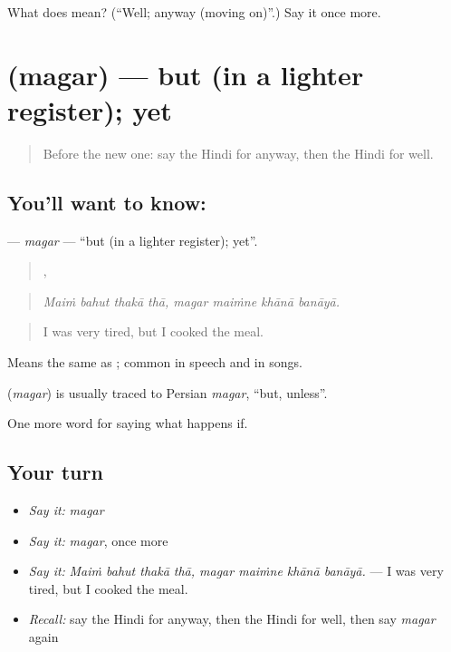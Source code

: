 \begin{tcolorbox}[breakable,colback=teal!4,colframe=teal!35!black,title={Before you move on}]
What does  mean? (\textquotedblleft{}Well; anyway (moving on)\textquotedblright{}.) Say it once more.
\end{tcolorbox}
\section[\texorpdfstring{\hi{मगर} (magar)}{मगर (magar)}]{ (magar) — but (in a lighter register); yet}

\label{lesson:HI-C552-magar}



\begin{quote}
Before the new one: say the Hindi for anyway, then the Hindi for well.
\end{quote}

\subsection*{You'll want to know: }
\textbf{} — \emph{magar} — \textquotedblleft{}but (in a lighter register); yet\textquotedblright{}.

\begin{quote}
   ,    
\end{quote}

\begin{quote}
\emph{Maiṁ bahut thakā thā, magar maiṁne khānā banāyā.}
\end{quote}

\begin{quote}
I was very tired, but I cooked the meal.
\end{quote}

Means the same as ; common in speech and in songs.

\begin{cousinweb}
\textbf{} (\emph{magar}) is usually traced to Persian \emph{magar}, \textquotedblleft{}but, unless\textquotedblright{}.
\end{cousinweb}

\begin{grammarlens}[title={What you've built}]
One more word for saying what happens if.
\end{grammarlens}

\subsection*{Your turn}
\begin{itemize}
\raggedright
  \item \emph{Say it:} \emph{magar}
  \item \emph{Say it:} \emph{magar}, once more
  \item \emph{Say it:} \emph{Maiṁ bahut thakā thā, magar maiṁne khānā banāyā.} — I was very tired, but I cooked the meal.
  \item \emph{Recall:} say the Hindi for anyway, then the Hindi for well, then say \emph{magar} again
\end{itemize}

